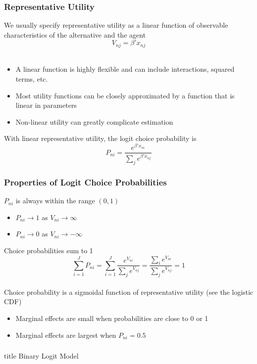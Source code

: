 \documentclass{beamer}\usepackage[]{graphicx}\usepackage[]{color}
\begin{document}
\begin{frame}\frametitle{Representative Utility}
    We usually specify representative utility as a linear function of observable characteristics of the alternative and the agent
    $$V_{nj} = \beta' x_{nj}$$ \\
    \begin{itemize}
    	\item A linear function is highly flexible and can include interactions, squared terms, etc.
    	\item Most utility functions can be closely approximated by a function that is linear in parameters
    	\item Non-linear utility can greatly complicate estimation
    \end{itemize}
    \vspace{3ex}
    With linear representative utility, the logit choice probability is
    $$P_{ni} = \frac{e^{\beta' x_{ni}}}{\sum_j e^{\beta' x_{nj}}}$$
\end{frame}

\begin{frame}\frametitle{Properties of Logit Choice Probabilities}
    $P_{ni}$ is always within the range $(0, 1)$
    \begin{itemize}
    	\item $P_{ni} \rightarrow 1$ as $V_{ni} \rightarrow \infty$
    	\item $P_{ni} \rightarrow 0$ as $V_{ni} \rightarrow -\infty$
    \end{itemize}
    \vspace{2ex}
    Choice probabilities sum to 1
    $$\sum_{i = 1}^J P_{ni} = \sum_{i = 1}^J \frac{e^{V_{ni}}}{\sum_j e^{V_{nj}}} =\frac{\sum_i e^{V_{ni}}}{\sum_j e^{V_{nj}}} = 1$$ \\
    \vspace{2ex}
    Choice probability is a sigmoidal function of representative utility (see the logistic CDF)
    \begin{itemize}
    	\item Marginal effects are small when probabilities are close to 0 or 1
    	\item Marginal effects are largest when $P_{ni} = 0.5$
    \end{itemize}
\end{frame}

\begin{frame}\frametitle{}
    \vfill
    \centering
    \begin{beamercolorbox}[center]{title}
        \Large Binary Logit Model
    \end{beamercolorbox}
    \vfill
\end{frame}
\end{document}
